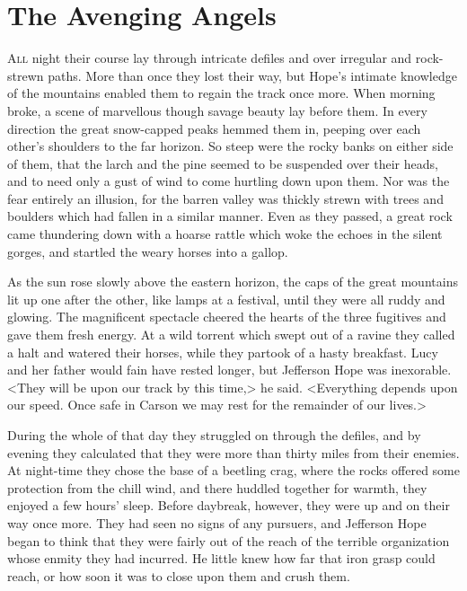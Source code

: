 \chapter{The Avenging Angels}
\lettrine{A}{ll} night their course lay through intricate defiles and over irregular and rock-strewn paths. More than once they lost their way, but Hope's intimate knowledge of the mountains enabled them to regain the track once more. When morning broke, a scene of marvellous though savage beauty lay before them. In every direction the great snow-capped peaks hemmed them in, peeping over each other's shoulders to the far horizon. So steep were the rocky banks on either side of them, that the larch and the pine seemed to be suspended over their heads, and to need only a gust of wind to come hurtling down upon them. Nor was the fear entirely an illusion, for the barren valley was thickly strewn with trees and boulders which had fallen in a similar manner. Even as they passed, a great rock came thundering down with a hoarse rattle which woke the echoes in the silent gorges, and startled the weary horses into a gallop.

As the sun rose slowly above the eastern horizon, the caps of the great mountains lit up one after the other, like lamps at a festival, until they were all ruddy and glowing. The magnificent spectacle cheered the hearts of the three fugitives and gave them fresh energy. At a wild torrent which swept out of a ravine they called a halt and watered their horses, while they partook of a hasty breakfast. Lucy and her father would fain have rested longer, but Jefferson Hope was inexorable. <They will be upon our track by this time,> he said. <Everything depends upon our speed. Once safe in Carson we may rest for the remainder of our lives.>

During the whole of that day they struggled on through the defiles, and by evening they calculated that they were more than thirty miles from their enemies. At night-time they chose the base of a beetling crag, where the rocks offered some protection from the chill wind, and there huddled together for warmth, they enjoyed a few hours' sleep. Before daybreak, however, they were up and on their way once more. They had seen no signs of any pursuers, and Jefferson Hope began to think that they were fairly out of the reach of the terrible organization whose enmity they had incurred. He little knew how far that iron grasp could reach, or how soon it was to close upon them and crush them.

